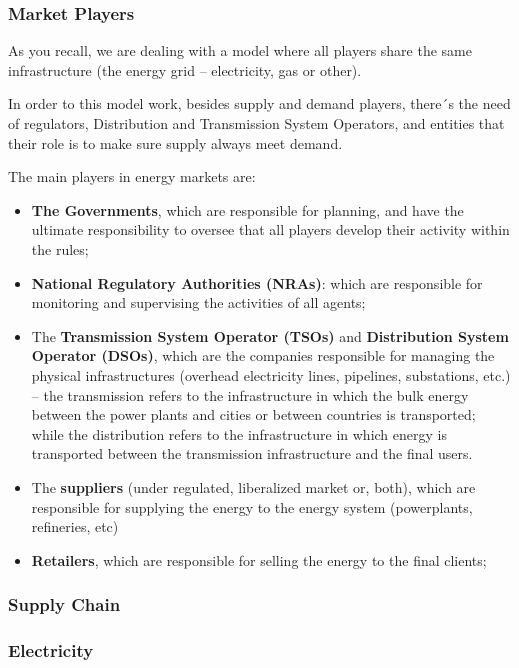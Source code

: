 \documentclass[]{book}
\theoremstyle{definition}
\theoremstyle{definition}
\theoremstyle{definition}
\theoremstyle{remark}
\begin{document}
\subsubsection{Market Players}\label{market-players}

As you recall, we are dealing with a model where all players share the
same infrastructure (the energy grid -- electricity, gas or other).

In order to this model work, besides supply and demand players, there´s
the need of regulators, Distribution and Transmission System Operators,
and entities that their role is to make sure supply always meet demand.

The main players in energy markets are:

\begin{itemize}
\item
  \textbf{The Governments}, which are responsible for planning, and have
  the ultimate responsibility to oversee that all players develop their
  activity within the rules;
\item
  \textbf{National Regulatory Authorities (NRAs)}: which are responsible
  for monitoring and supervising the activities of all agents;
\item
  The \textbf{Transmission System Operator (TSOs)} and
  \textbf{Distribution System Operator (DSOs)}, which are the companies
  responsible for managing the physical infrastructures (overhead
  electricity lines, pipelines, substations, etc.) -- the transmission
  refers to the infrastructure in which the bulk energy between the
  power plants and cities or between countries is transported; while the
  distribution refers to the infrastructure in which energy is
  transported between the transmission infrastructure and the final
  users.
\item
  The \textbf{suppliers} (under regulated, liberalized market or, both),
  which are responsible for supplying the energy to the energy system
  (powerplants, refineries, etc)
\item
  \textbf{Retailers}, which are responsible for selling the energy to
  the final clients;
\end{itemize}

\subsubsection{Supply Chain}\label{supply-chain}

\subsubsection{Electricity}\label{electricity}
\end{document}
